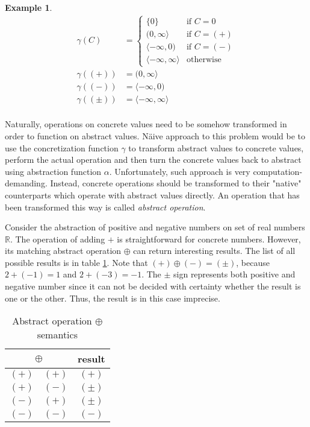 \documentclass[12pt,final,oneside]{fithesis2}
\theoremstyle{definition}
\newtheorem{example}{Example}
\begin{document}
\begin{example}
\label{ex:concretizationfunc}
\begin{align*}
\gamma(C) &=
\begin{cases}
\{ 0 \} & \text{if } C = 0 \\
(0, \infty \rangle & \text{if } C = (+) \\
\langle -\infty, 0) & \text{if } C = (-) \\
\langle -\infty, \infty \rangle & \text{otherwise}
\end{cases} \\
\gamma((+)) &= (0, \infty \rangle \\
\gamma((-)) &= \langle -\infty, 0) \\
\gamma((\pm)) &= \langle -\infty, \infty \rangle \\
\end{align*}
\end{example}

Naturally, operations on concrete values need to be somehow transformed
in order to function on abstract values. N\"{a}ive approach to this problem
would be to use the concretization function $\gamma$ to transform abstract
values to concrete values, perform the actual operation and then turn the
concrete values back to abstract using abstraction function $\alpha$.
Unfortunately, such approach is very computation-demanding. Instead,
concrete operations should be transformed to their "native" counterparts
which operate with abstract values directly. An operation that has been
transformed this way is called \textit{abstract operation}.

Consider the abstraction of positive and negative numbers on set of real
numbers $\mathbb{R}$. The operation of adding $+$ is straightforward for
concrete numbers. However, its matching abstract operation $\oplus$ can
return interesting results. The list of all possible results is in
table \ref{tab:abstractplus}. Note that $(+) \oplus (-) = (\pm)$, because
$2 + (-1) = 1$ and $2 + (-3) = -1$. The $\pm$ sign represents both
positive and negative number since it can not be decided with certainty
whether the result is one or the other. Thus, the result is in this case
imprecise.

\begin{table}[ht]
\centering
\begin{tabular}{c|c|c}
\multicolumn{2}{c|}{$\oplus$} & result \\
\hline
$(+)$ & $(+)$ & $(+)$ \\
$(+)$ & $(-)$ & $(\pm)$ \\
$(-)$ & $(+)$ & $(\pm)$ \\
$(-)$ & $(-)$ & $(-)$ \\
\end{tabular}
\caption{Abstract operation $\oplus$ semantics}
\label{tab:abstractplus}
\end{table}
\end{document}
